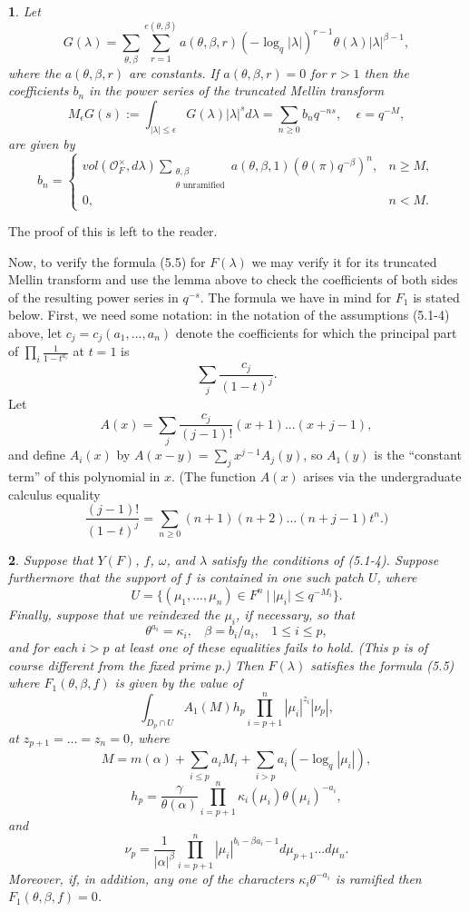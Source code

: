 \documentclass[12pt,letterpaper]{amsart}
\newcommand{\proclaimname}{}
\newtheorem*{proclaimx}{\proclaimname}
\newenvironment{proclaim}[1]%
  {\renewcommand{\proclaimname}{#1}\begin{proclaimx}}{\end{proclaimx}}
\begin{document}
\begin{proclaim}{Lemma 5.6} Let
\[
G(\lambda) =\sum_{\theta,\beta}\sum_{r=1}^{e(\theta,\beta)}
a(\theta,\beta,r)(-\log_q|\lambda|)^{r-1}\theta(\lambda)|\lambda|^{\beta -1},
\]
where the $a(\theta,\beta,r)$ are constants. If
$a(\theta,\beta,r)=0$ for $r>1$ then
the coefficients $b_n$ in the power series of the
truncated Mellin transform
\[
M_\epsilon G(s):=\int_{|\lambda|\leq \epsilon}
G(\lambda)|\lambda|^sd\lambda =\sum_{n\geq 0}b_nq^{-ns},
\ \ \ \ \ \epsilon=q^{-M},
\]
are given by
\[
b_n=
\begin{cases}
vol({\mathcal O}_F^\times,d\lambda)
\sum_{\substack{ \theta,\beta\\ \theta\text{ unramified}}}
a(\theta,\beta,1)(\theta(\pi)q^{-\beta})^n,&n\geq M,\\
0,& n<M.
\end{cases}
\]
\end{proclaim}

The proof of this is left to the reader.

Now, to verify the formula (5.5) for $F(\lambda)$ we may
verify it for its truncated Mellin transform
and use the lemma above to check the coefficients of
both sides of the resulting power series in
$q^{-s}$. The formula we have in mind for $F_1$ is stated below.
First, we need some notation: in the notation of the assumptions
(5.1-4) above, let $c_j=c_j(a_1,...,a_n)$ denote
the coefficients for which the principal part of
$\prod_i\frac{1}{1-t^{a_i}}$ at $t=1$ is
\[
\sum_j\frac{c_j}{(1-t)^j}.
\]
Let
\[
A(x)=\sum_j \frac{c_j}{(j-1)!}(x+1)...(x+j-1),
\]
and define $A_i(x)$ by $A(x-y)=\sum_j x^{j-1}A_j(y)$,
so $A_1(y)$ is the ``constant term'' of this polynomial in $x$.
(The function $A(x)$ arises via the undergraduate calculus equality
\[
\frac{(j-1)!}{(1-t)^j}
=\sum_{n\geq 0}(n+1)(n+2)...(n+j-1)t^n.)
\]

\begin{proclaim}{Lemma 5.7} Suppose that $Y(F)$, $f$, $\omega$, and
$\lambda$ satisfy the conditions of (5.1-4). Suppose furthermore
that the support of $f$ is contained in one such patch
$U$, where
\[
U=\{(\mu_1,...,\mu_n)\in F^n\ |\ |\mu_i|\leq q^{-M_i}\}.
\]
Finally, suppose that we reindexed the $\mu_i$, if
necessary, so that
\[
\theta^{a_i}=\kappa_i,\ \ \ \ \beta=b_i/a_i,\ \ \ \
1\leq i\leq p,
\]
and for each $i>p$ at least one of these equalities fails to hold.
(This $p$ is of course different from the fixed prime $p$.)
Then $F(\lambda)$ satisfies the formula (5.5)
where $F_1(\theta,\beta,f)$ is given by the value of
\[
\int_{D_p\cap U}A_1(M)h_p\prod_{i=p+1}^n|\mu_i|^{z_i}|\nu_p|,
\]
at $z_{p+1}=...=z_n=0$, where
\[
M=m(\alpha)+\sum_{i\leq p}a_iM_i +\sum_{i>p}a_i(-\log_q|\mu_i|),
\]
\[
h_p=\frac{\gamma}{\theta(\alpha)}
\prod_{i=p+1}^n\kappa_i(\mu_i)\theta(\mu_i)^{-a_i},
\]
and
\[
\nu_p=\frac{1}{|\alpha|^\beta}
\prod_{i=p+1}^n|\mu_i|^{b_i-\beta a_i-1}d\mu_{p+1}...d\mu_n.
\]
Moreover, if, in addition, any one of the characters $\kappa_i\theta^{-a_i}$
is ramified then $F_1(\theta,\beta,f)=0$.
\end{proclaim}
\end{document}
